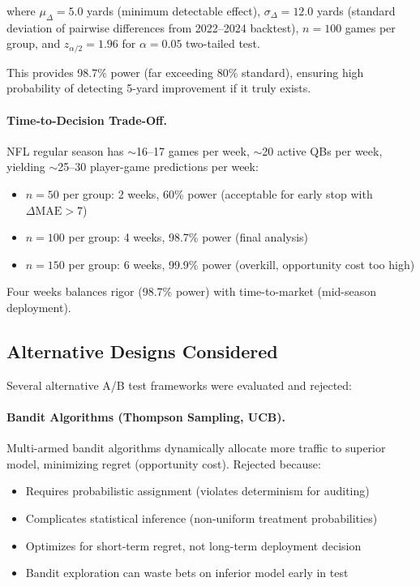 where $\mu_{\Delta} = 5.0$ yards (minimum detectable effect), $\sigma_{\Delta} = 12.0$ yards (standard deviation of pairwise differences from 2022--2024 backtest), $n = 100$ games per group, and $z_{\alpha/2} = 1.96$ for $\alpha = 0.05$ two-tailed test.

This provides 98.7\% power (far exceeding 80\% standard), ensuring high probability of detecting 5-yard improvement if it truly exists.

\paragraph{Time-to-Decision Trade-Off.}
NFL regular season has $\sim$16--17 games per week, $\sim$20 active QBs per week, yielding $\sim$25--30 player-game predictions per week:

\begin{itemize}[itemsep=2pt,parsep=0pt]
    \item $n = 50$ per group: 2 weeks, 60\% power (acceptable for early stop with $\Delta\text{MAE} > 7$)
    \item $n = 100$ per group: 4 weeks, 98.7\% power (final analysis)
    \item $n = 150$ per group: 6 weeks, 99.9\% power (overkill, opportunity cost too high)
\end{itemize}

Four weeks balances rigor (98.7\% power) with time-to-market (mid-season deployment).

\subsection{Alternative Designs Considered}

Several alternative A/B test frameworks were evaluated and rejected:

\paragraph{Bandit Algorithms (Thompson Sampling, UCB).}
Multi-armed bandit algorithms dynamically allocate more traffic to superior model, minimizing regret (opportunity cost). Rejected because:
\begin{itemize}[itemsep=2pt,parsep=0pt]
    \item Requires probabilistic assignment (violates determinism for auditing)
    \item Complicates statistical inference (non-uniform treatment probabilities)
    \item Optimizes for short-term regret, not long-term deployment decision
    \item Bandit exploration can waste bets on inferior model early in test
\end{itemize}

